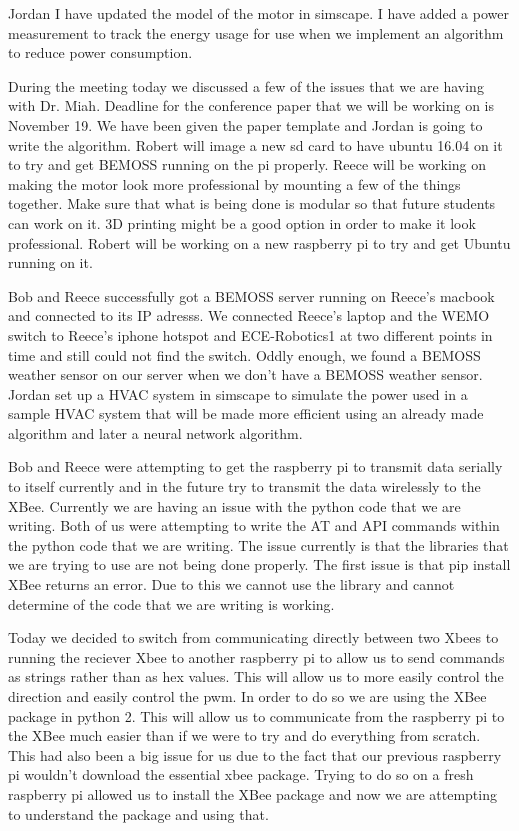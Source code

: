 \documentclass[fontsize=11pt, %
                             paper=letter, %
                             twoside, %
                             captions=tableheading,
                             index=totoc,
                             hyperref]{labbook}
\begin{document}
Jordan
\newline
I have updated the model of the motor in simscape. I have added a power measurement to track the energy usage for use when we implement an algorithm to reduce power consumption.


During the meeting today we discussed a few of the issues that we are having with Dr. Miah. 
Deadline for the conference paper that we will be working on is November 19. We have been given the paper template and Jordan is going to write the algorithm. Robert will image a new sd card to have ubuntu 16.04 on it to try and get BEMOSS running on the pi properly. Reece will be working on making the motor look more professional by mounting a few of the things together. Make sure that what is being done is modular so that future students can work on it. 3D printing might be a good option in order to make it look professional. Robert will be working on a new raspberry pi to try and get Ubuntu running on it.




Bob and Reece successfully got a BEMOSS server running on Reece's macbook and connected to its IP adresss. We connected Reece's laptop and the WEMO switch to Reece's iphone hotspot and ECE-Robotics1 at two different points in time and still could not find the switch. Oddly enough, we found a BEMOSS weather sensor on our server when we don't have a BEMOSS weather sensor. 
\newline
Jordan set up a HVAC system in simscape to simulate the power used in a sample HVAC system that will be made more efficient using an already made algorithm and later a neural network algorithm.


Bob and Reece were attempting to get the raspberry pi to transmit data serially to itself currently and in the future try to transmit the data wirelessly to the XBee. Currently we are having an issue with the python code that we are writing. Both of us were attempting to write the AT and API commands within the python code that we are writing. The issue currently is that the libraries that we are trying to use are not being done properly. The first issue is that pip install XBee returns an error. Due to this we cannot use the library and cannot determine of the code that we are writing is working.

Today we decided to switch from communicating directly between two Xbees to running the reciever Xbee to another raspberry pi to allow us to send commands as strings rather than as hex values. This will allow us to more easily control the direction and easily control the pwm. In order to do so we are using the XBee package in python 2. This will allow us to communicate from the raspberry pi to the XBee much easier than if we were to try and do everything from scratch. This had also been a big issue for us due to the fact that our previous raspberry pi wouldn't download the essential xbee package. Trying to do so on a fresh raspberry pi allowed us to install the XBee package and now we are attempting to understand the package and using that.
\end{document}
